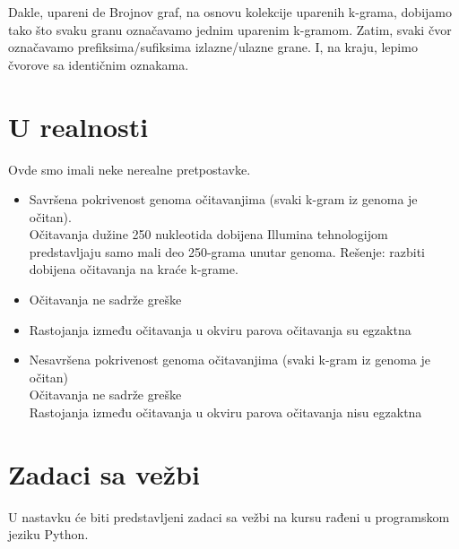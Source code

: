 Dakle, upareni de Brojnov graf, na osnovu kolekcije uparenih k-grama, dobijamo tako što svaku granu označavamo jednim uparenim k-gramom. Zatim, svaki čvor označavamo prefiksima/sufiksima izlazne/ulazne grane. I, na kraju, lepimo čvorove sa identičnim oznakama.

\section{U realnosti}

Ovde smo imali neke nerealne pretpostavke.
\begin{itemize}
	\item  Savršena pokrivenost genoma očitavanjima (svaki k-gram iz genoma je očitan). \\
	Očitavanja dužine 250 nukleotida dobijena Illumina tehnologijom predstavljaju samo mali deo 250-grama unutar genoma. Rešenje: razbiti dobijena očitavanja na kraće k-grame.
	\item Očitavanja ne sadrže greške
	\item Rastojanja između očitavanja u okviru parova očitavanja su egzaktna
	\item Nesavršena pokrivenost genoma očitavanjima (svaki k-gram iz genoma je očitan)
	\\ Očitavanja ne sadrže greške
	\\ Rastojanja između očitavanja u okviru parova očitavanja nisu egzaktna
\end{itemize}


\section{Zadaci sa vežbi}
U nastavku će biti predstavljeni zadaci sa vežbi na kursu rađeni u programskom jeziku Python.


